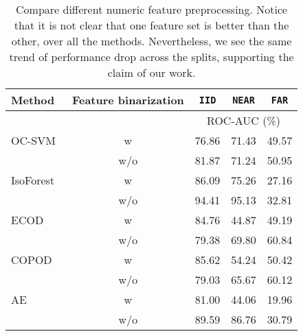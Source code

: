 \documentclass{article}
\begin{document}
\begingroup
\begin{table}[t]
\begin{center}
    \caption{Compare different numeric feature preprocessing. Notice that it is not clear that one feature set is better than the other, over all the methods. Nevertheless, we see the same trend of performance drop across the splits, supporting the claim of our work. }
    
    \begin{tabular}{l c ccc}
    \toprule
    Method & Feature binarization & \texttt{IID}      & \texttt{NEAR}    & \texttt{FAR}     \\
    \midrule
                 & & \multicolumn{3}{c}{ROC-AUC (\%) }  \\
    \cmidrule{3-5}
    OC-SVM~\cite{ocsvm}  & w  & 76.86 & 71.43 & 49.57 \\
             & w/o & 81.87 & 71.24	& 50.95 \\
    \cmidrule(lr){2-5}
    IsoForest~\cite{isoforest}     & w & 86.09 & 75.26 & 27.16 \\
             & w/o & 94.41 & 95.13 & 32.81  \\
    \cmidrule(lr){2-5}
    ECOD~\cite{ecod}  & w  & 84.76 & 44.87 & 49.19\\
             & w/o & 79.38 & 69.80 & 60.84 \\
    \cmidrule(lr){2-5}
    COPOD~\cite{copod}  & w  & 85.62 & 54.24 & 50.42\\
             & w/o & 79.03 & 65.67 & 60.12 \\
    \cmidrule(lr){2-5}
AE~\cite{autoencoder}  & w  & 81.00 & 44.06 & 19.96\\
             & w/o & 89.59 & 86.76 & 30.79 \\
    
    \bottomrule
    \end{tabular}
    \label{aptab:numerical_preprocess}
\end{center}
\end{table}
\endgroup
\end{document}
